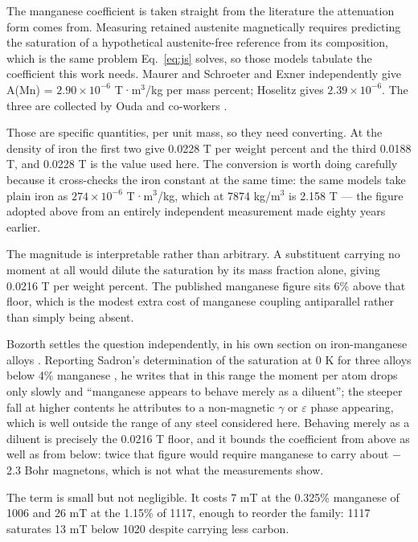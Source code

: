 \documentclass[
  11pt,
]{article}
\begin{document}
The manganese coefficient is taken straight from the literature the attenuation form comes from. Measuring retained austenite magnetically requires predicting the saturation of a hypothetical austenite-free reference from its composition, which is the same problem Eq.~\eqref{eq:js} solves, so those models tabulate the coefficient this work needs. Maurer and Schroeter and Exner \cite{exner1960} independently give A(Mn) = \(2.90\times10^{-6}\) T·m\(^{3}\)/kg per mass percent; Hoselitz \cite{hoselitz1952} gives \(2.39\times10^{-6}\). The three are collected by Ouda and co-workers \cite{ouda2018}.

Those are specific quantities, per unit mass, so they need converting. At the density of iron the first two give 0.0228 T per weight percent and the third 0.0188 T, and 0.0228 T is the value used here. The conversion is worth doing carefully because it cross-checks the iron constant at the same time: the same models take plain iron as \(274\times10^{-6}\) T·m\(^{3}\)/kg, which at 7874 kg/m\(^{3}\) is 2.158 T --- the figure adopted above from an entirely independent measurement made eighty years earlier.

The magnitude is interpretable rather than arbitrary. A substituent carrying no moment at all would dilute the saturation by its mass fraction alone, giving 0.0216 T per weight percent. The published manganese figure sits 6\% above that floor, which is the modest extra cost of manganese coupling antiparallel rather than simply being absent.

Bozorth settles the question independently, in his own section on iron-manganese alloys \cite{bozorth1951}. Reporting Sadron's determination of the saturation at 0 K for three alloys below 4\% manganese \cite{sadron1932}, he writes that in this range the moment per atom drops only slowly and ``manganese appears to behave merely as a diluent''; the steeper fall at higher contents he attributes to a non-magnetic \(\gamma\) or \(\varepsilon\) phase appearing, which is well outside the range of any steel considered here. Behaving merely as a diluent is precisely the 0.0216 T floor, and it bounds the coefficient from above as well as from below: twice that figure would require manganese to carry about \(-\)2.3 Bohr magnetons, which is not what the measurements show.

The term is small but not negligible. It costs 7 mT at the 0.325\% manganese of 1006 and 26 mT at the 1.15\% of 1117, enough to reorder the family: 1117 saturates 13 mT below 1020 despite carrying less carbon.
\end{document}
